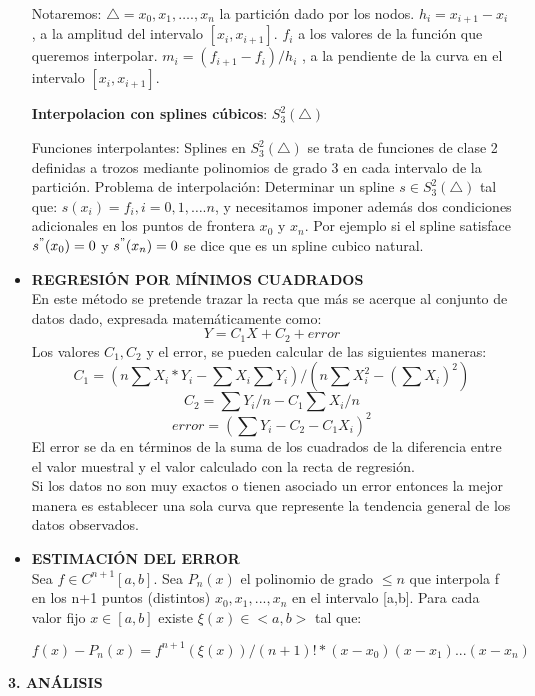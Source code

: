 \documentclass[10pt,a4paper]{article}
\begin{document}
\begin{multicols}{2}
\begin{itemize}
	Notaremos:
	$\triangle={x_0,x_1,….,x_n  }$ la partición dado por los nodos.
	$h_i=x_{i+1}-x_i$ , a la amplitud del intervalo $[x_i,x_{i+1}]$.
	$f_i$ a los valores de la función que queremos interpolar.
	$m_i=(f_{i+1}-f_i)/h_i$ , a la pendiente de la curva en el intervalo $[x_i,x_{i+1}]$.
	
	\textbf{Interpolacion con splines cúbicos}: $S_3^2 (\triangle)$
	
	Funciones interpolantes: Splines en $S_3^2 (\triangle)$ se trata de funciones de clase 2 definidas a trozos mediante polinomios de grado 3 en cada intervalo de la partición. 
	Problema de interpolación: Determinar un spline $s\in S_3^2 (\triangle)$ tal que:
	$s (x_i )=f_i, i=0,1,….n$, y necesitamos imponer además dos condiciones adicionales en los puntos de frontera $x_0$ y $x_n$. Por ejemplo si el spline satisface  $s^" (x_0 )=0$ y $s^" (x_n )=0$ se dice que es un spline cubico natural.
	
	\item \textbf{REGRESIÓN POR MÍNIMOS CUADRADOS}\\
	En este método se pretende trazar la recta que más se acerque al conjunto de datos dado, expresada matemáticamente como: \[Y=C_1X+C_2+error\]
	Los valores $C_1, C_2$ y el error, se pueden calcular de las siguientes maneras:
	{\scriptsize \[C_1=(n\sum X_i*Y_i -\sum X_i\sum Y_i)/(n\sum X_i^{2}-(\sum X_i)^{2})\]}
	\[C_2=\sum Y_i/n - C_1\sum X_i/n\]
	\[error=(\sum Y_i-C_2-C_1X_i)^{2}\]
	El error se da en términos de la suma de los cuadrados de la diferencia entre el valor muestral y el valor calculado con la recta de regresión.\\
	Si los datos no son muy exactos o tienen asociado un error entonces la mejor manera es establecer una sola curva que represente la tendencia general de los datos observados.
	
	\item \textbf{ESTIMACIÓN DEL ERROR}\\
	Sea $f\in C^{n+1}[a,b]$. Sea $P_n(x)$ el polinomio de grado $\leq n$ que interpola f en los n+1 puntos (distintos) $x_0, x_1, ..., x_n$ en el intervalo [a,b]. Para cada valor fijo $x\in [a,b]$ existe $\xi (x) \in <a,b>$ tal que:
	
	 $f(x)-P_n(x) = f^{n+1}(\xi (x))/(n+1)! * (x-x_0)(x-x_1)...(x-x_n)$

\end{itemize}

\begin{center}
	{\large \bf 3. ANÁLISIS}
	

\end{center}
\end{multicols}
\end{document}
